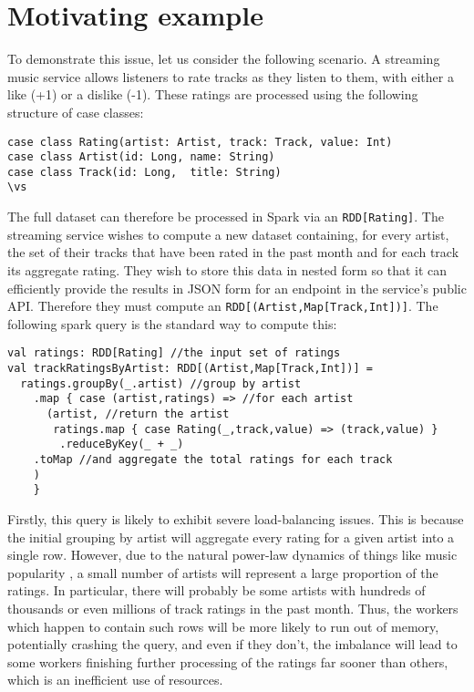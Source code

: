 \section{Motivating example} {

To demonstrate this issue, let us consider the following scenario. A streaming music service allows listeners to rate tracks as they listen to them, with either a like (+1) or a dislike (-1). These ratings are processed using the following structure of case classes:
\vs\begin{lstlisting}
case class Rating(artist: Artist, track: Track, value: Int)
case class Artist(id: Long, name: String)
case class Track(id: Long,  title: String)
\vs\end{lstlisting}
The full dataset can therefore be processed in Spark via an \lstinline{RDD[Rating]}. The streaming service wishes to compute a new dataset containing, for every artist, the set of their tracks that have been rated in the past month and for each track its aggregate rating. They wish to store this data in nested form so that it can efficiently provide the results in JSON form for an endpoint in the service's public API. Therefore they must compute an \lstinline{RDD[(Artist,Map[Track,Int])]}. The following spark query is the standard way to compute this:
\vs\begin{lstlisting}
val ratings: RDD[Rating] //the input set of ratings
val trackRatingsByArtist: RDD[(Artist,Map[Track,Int])] =
  ratings.groupBy(_.artist) //group by artist
    .map { case (artist,ratings) => //for each artist
      (artist, //return the artist
       ratings.map { case Rating(_,track,value) => (track,value) } 
        .reduceByKey(_ + _)
	.toMap //and aggregate the total ratings for each track
	)
    }
\end{lstlisting}\vs
Firstly, this query is likely to exhibit severe load-balancing issues. This is because the initial grouping by artist will aggregate every rating for a given artist into a single row. However, due to the natural power-law dynamics of things like music popularity \cite{}, a small number of artists will represent a large proportion of the ratings. In particular, there will probably be some artists with hundreds of thousands or even millions of track ratings in the past month. Thus, the workers which happen to contain such rows will be more likely to run out of memory, potentially crashing the query, and even if they don't, the imbalance will lead to some workers finishing further processing of the ratings far sooner than others, which is an inefficient use of resources.

}
